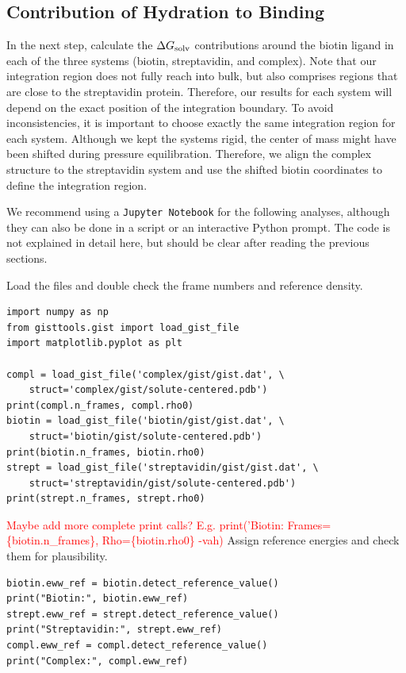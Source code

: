 \documentclass[9pt,tutorial]{livecoms}
\newcommand{\dgsolv}{\Delta G_\textup{solv}}
\newcommand{\software}{\texttt}
\newcommand{\todo}{\textcolor{red}}
\begin{document}
\subsection{Contribution of Hydration to Binding}
In the next step, calculate the $\dgsolv$ contributions around the biotin ligand in each of the three systems (biotin, streptavidin, and complex).
Note that our integration region does not fully reach into bulk, but also comprises regions that are close to the streptavidin protein. 
Therefore, our results for each system will depend on the exact position of the integration boundary. 
To avoid inconsistencies, it is important to choose exactly the same integration region for each system.
Although we kept the systems rigid, the center of mass might have been shifted during pressure equilibration.
Therefore, we align the complex structure to the streptavidin system and use the shifted biotin coordinates to define the integration region.

We recommend using a \software{Jupyter Notebook} for the following analyses, although they can also be done in a script or an interactive Python prompt.
The code is not explained in detail here, but should be clear after reading the previous sections.

Load the files and double check the frame numbers and reference density.
\begin{lstlisting}[style=python]
import numpy as np
from gisttools.gist import load_gist_file
import matplotlib.pyplot as plt

compl = load_gist_file('complex/gist/gist.dat', \
    struct='complex/gist/solute-centered.pdb')
print(compl.n_frames, compl.rho0)
biotin = load_gist_file('biotin/gist/gist.dat', \
    struct='biotin/gist/solute-centered.pdb')
print(biotin.n_frames, biotin.rho0)
strept = load_gist_file('streptavidin/gist/gist.dat', \
    struct='streptavidin/gist/solute-centered.pdb')
print(strept.n_frames, strept.rho0)
\end{lstlisting}
\todo{Maybe add more complete print calls? E.g. print('Biotin: Frames=\{biotin.n\_frames\}, Rho=\{biotin.rho0\} -vah)}
Assign reference energies and check them for plausibility.
\begin{lstlisting}[style=python]
biotin.eww_ref = biotin.detect_reference_value()
print("Biotin:", biotin.eww_ref)
strept.eww_ref = strept.detect_reference_value()
print("Streptavidin:", strept.eww_ref)
compl.eww_ref = compl.detect_reference_value()
print("Complex:", compl.eww_ref)
\end{lstlisting}
\end{document}
